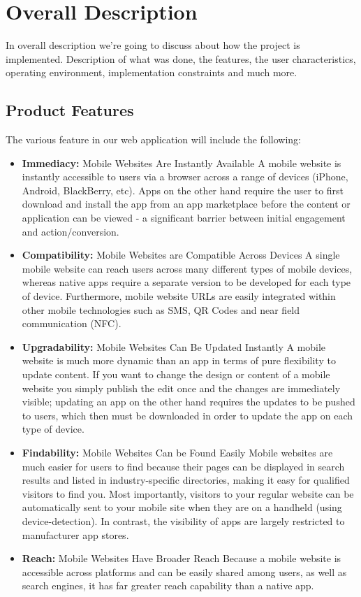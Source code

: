 \documentclass[BTech]{srmuthesis}
\begin{document}
\section{Overall Description}
In overall description we're going to discuss about how the project is implemented. Description of what was done, the features, the user characteristics, operating environment, implementation constraints and much more.
\subsection{Product Features}
The various feature in our web application will include the following:
\begin{itemize}
\item\textbf{Immediacy:} Mobile Websites Are Instantly Available 
A mobile website is instantly accessible to users via a browser across a range of devices (iPhone, Android, BlackBerry, etc).  Apps on the other hand require the user to first download and install the app from an app marketplace before the content or application can be viewed - a significant barrier between initial engagement and action/conversion. 
\item\textbf{Compatibility:} Mobile Websites are Compatible Across Devices
A single mobile website can reach users across many different types of mobile devices, whereas native apps require a separate version to be developed for each type of device. Furthermore, mobile website URLs are easily integrated within other mobile technologies such as SMS, QR Codes and near field communication (NFC).
\item\textbf{Upgradability:}  Mobile Websites Can Be Updated Instantly
A mobile website is much more dynamic than an app in terms of pure flexibility to update content. If you want to change the design or content of a mobile website you simply publish the edit once and the changes are immediately visible; updating an app on the other hand requires the updates to be pushed to users, which then must be downloaded in order to update the app on each type of device. 
\item\textbf{Findability:} Mobile Websites Can be Found Easily
Mobile websites are much easier for users to find because their pages can be displayed in search results and listed in industry-specific directories, making it easy for qualified visitors to find you. Most importantly, visitors to your regular website can be automatically sent to your mobile site when they are on a handheld (using device-detection).  In contrast, the visibility of apps are largely restricted to manufacturer app stores.
\item\textbf{Reach:} Mobile Websites Have Broader Reach
Because a mobile website is accessible across platforms and can be easily shared among users, as well as search engines, it has far greater reach capability than a native app. 
\end{itemize}
\end{document}
